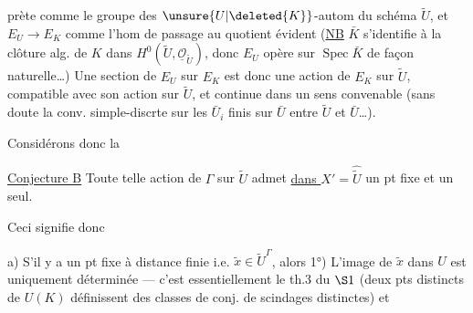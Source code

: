 prète comme le groupe  des $\unsure{U|\deleted{K}}$-autom du schéma $\widetilde U$, et $E_U\longrightarrow E_K$ comme l'hom de passage au quotient évident (\uline{NB} $\bar K$ s'identifie à la clôture alg. de $K$ dans $H^0(\widetilde U,\underline{\mathcal O}_{\widetilde U})$, donc $E_U$ opère sur $\operatorname{Spec}\bar K$ de façon naturelle\ldots) Une section de $E_U$ sur $E_K$ est donc une action de $E_K$ sur $\widetilde U$, compatible avec son action sur $\widetilde U$, et continue dans un sens convenable (sans doute la conv. simple-discrte sur les  $\bar U_i$ finis sur $\bar U$ entre $\widetilde U$ et $\bar U$\ldots).

Considérons donc la

\uline{Conjecture B} Toute telle action de $\Gamma$ sur $\widetilde U$ admet \uline{dans $X'$}$=\widehat{\widetilde U}$ un pt fixe et un seul.

Ceci signifie donc

a) S'il y a un pt fixe à distance finie i.e. $\widetilde x\in\widetilde U^\Gamma$, alors 1°) L'image de $\widetilde x$ dans $U$ est uniquement déterminée --- c'est essentiellement le th.3 du $\S1$ (deux pts distincts de $U(K)$ définissent des classes de conj. de scindages distinctes) et
